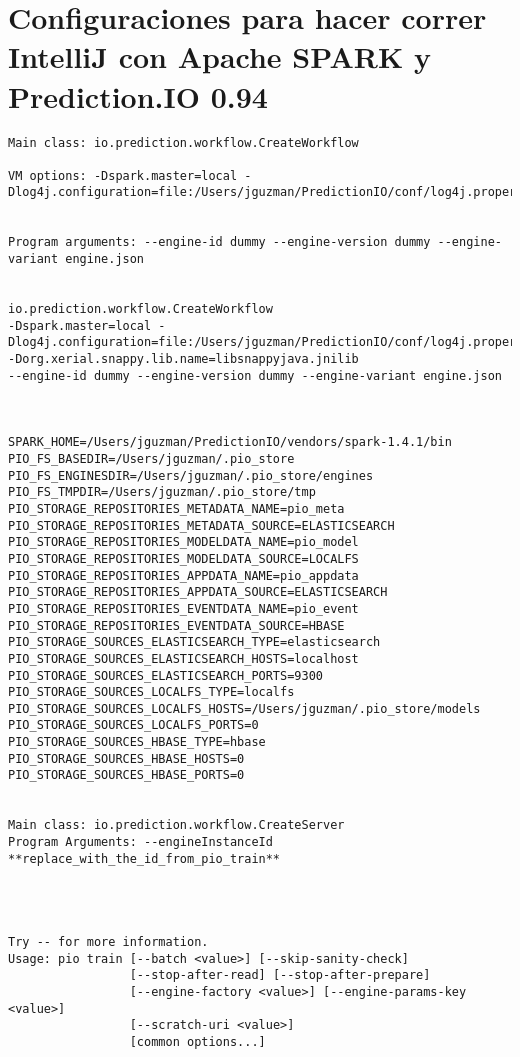 \section{Configuraciones para hacer correr IntelliJ con Apache SPARK y Prediction.IO 0.94}

\begin{lstlisting}[frame=single,basicstyle=\ttfamily\tiny,]
Main class: io.prediction.workflow.CreateWorkflow

VM options: -Dspark.master=local -Dlog4j.configuration=file:/Users/jguzman/PredictionIO/conf/log4j.properties


Program arguments: --engine-id dummy --engine-version dummy --engine-variant engine.json


io.prediction.workflow.CreateWorkflow
-Dspark.master=local -Dlog4j.configuration=file:/Users/jguzman/PredictionIO/conf/log4j.properties -Dorg.xerial.snappy.lib.name=libsnappyjava.jnilib 
--engine-id dummy --engine-version dummy --engine-variant engine.json



SPARK_HOME=/Users/jguzman/PredictionIO/vendors/spark-1.4.1/bin
PIO_FS_BASEDIR=/Users/jguzman/.pio_store
PIO_FS_ENGINESDIR=/Users/jguzman/.pio_store/engines
PIO_FS_TMPDIR=/Users/jguzman/.pio_store/tmp
PIO_STORAGE_REPOSITORIES_METADATA_NAME=pio_meta
PIO_STORAGE_REPOSITORIES_METADATA_SOURCE=ELASTICSEARCH
PIO_STORAGE_REPOSITORIES_MODELDATA_NAME=pio_model
PIO_STORAGE_REPOSITORIES_MODELDATA_SOURCE=LOCALFS
PIO_STORAGE_REPOSITORIES_APPDATA_NAME=pio_appdata
PIO_STORAGE_REPOSITORIES_APPDATA_SOURCE=ELASTICSEARCH
PIO_STORAGE_REPOSITORIES_EVENTDATA_NAME=pio_event
PIO_STORAGE_REPOSITORIES_EVENTDATA_SOURCE=HBASE
PIO_STORAGE_SOURCES_ELASTICSEARCH_TYPE=elasticsearch
PIO_STORAGE_SOURCES_ELASTICSEARCH_HOSTS=localhost
PIO_STORAGE_SOURCES_ELASTICSEARCH_PORTS=9300
PIO_STORAGE_SOURCES_LOCALFS_TYPE=localfs
PIO_STORAGE_SOURCES_LOCALFS_HOSTS=/Users/jguzman/.pio_store/models
PIO_STORAGE_SOURCES_LOCALFS_PORTS=0
PIO_STORAGE_SOURCES_HBASE_TYPE=hbase
PIO_STORAGE_SOURCES_HBASE_HOSTS=0
PIO_STORAGE_SOURCES_HBASE_PORTS=0


Main class: io.prediction.workflow.CreateServer
Program Arguments: --engineInstanceId **replace_with_the_id_from_pio_train**




Try -- for more information.
Usage: pio train [--batch <value>] [--skip-sanity-check]
                 [--stop-after-read] [--stop-after-prepare]
                 [--engine-factory <value>] [--engine-params-key <value>]
                 [--scratch-uri <value>]
                 [common options...]


\end{lstlisting}
